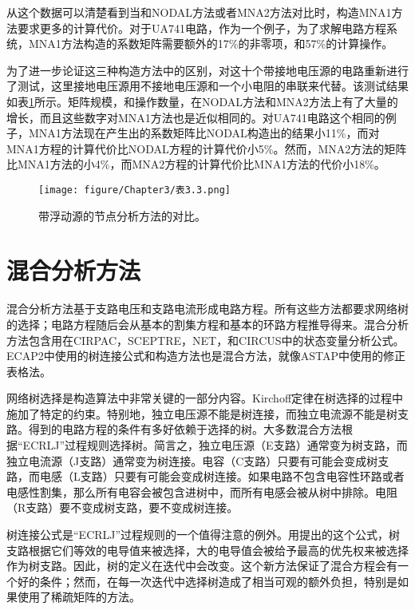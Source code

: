 从这个数据可以清楚看到当和NODAL方法或者MNA2方法对比时，构造MNA1方法要求更多的计算代价。对于UA741电路，作为一个例子，为了求解电路方程系统，MNA1方法构造的系数矩阵需要额外的17\%的非零项，和57\%的计算操作。

为了进一步论证这三种构造方法中的区别，对这十个带接地电压源的电路重新进行了测试，这里接地电压源用不接地电压源和一个小电阻的串联来代替。该测试结果如表\ref{表3.3}所示。矩阵规模，和操作数量，在NODAL方法和MNA2方法上有了大量的增长，而且这些数字对MNA1方法也是近似相同的。对UA741电路这个相同的例子，MNA1方法现在产生出的系数矩阵比NODAL构造出的结果小11\%，而对MNA1方程的计算代价比NODAL方程的计算代价小5\%。然而，MNA2方法的矩阵比MNA1方法的小4\%，而MNA2方程的计算代价比MNA1方法的代价小18\%。

\begin{figure}[htbp]
\small
    \centering
    \texttt{[image: figure/Chapter3/表3.3.png]}
    \caption{带浮动源的节点分析方法的对比。}
    \label{表3.3}
\end{figure}

\section{混合分析方法}
混合分析方法基于支路电压和支路电流形成电路方程。所有这些方法都要求网络树的选择；电路方程随后会从基本的割集方程和基本的环路方程推导得来。混合分析方法包含用在CIRPAC\cite{ref-41,ref-42}，SCEPTRE\cite{ref-43}，NET\cite{ref-44}，和CIRCUS\cite{ref-45}中的状态变量分析公式。ECAP2\cite{ref-31,ref-32}中使用的树连接公式\cite{ref-48}和构造方法也是混合方法，就像ASTAP\cite{ref-28,ref-29}中使用的修正表格法。

网络树选择是构造算法中非常关键的一部分内容。Kirchoff定律在树选择的过程中施加了特定的约束。特别地，独立电压源不能是树连接，而独立电流源不能是树支路。得到的电路方程的条件有多好依赖于选择的树。大多数混合方法根据“ECRLJ”过程规则选择树。简言之，独立电压源（E支路）通常变为树支路，而独立电流源（J支路）通常变为树连接。电容（C支路）只要有可能会变成树支路，而电感（L支路）只要有可能会变成树连接。如果电路不包含电容性环路或者电感性割集，那么所有电容会被包含进树中，而所有电感会被从树中排除。电阻（R支路）要不变成树支路，要不变成树连接。

树连接公式\cite{ref-47}是“ECRLJ”过程规则的一个值得注意的例外。用提出的这个公式，树支路根据它们等效的电导值来被选择，大的电导值会被给予最高的优先权来被选择作为树支路。因此，树的定义在迭代中会改变。这个新方法保证了混合方程会有一个好的条件；然而，在每一次迭代中选择树造成了相当可观的额外负担，特别是如果使用了稀疏矩阵的方法。

